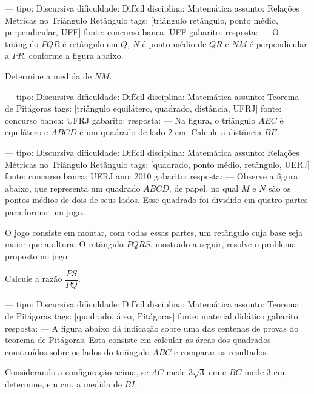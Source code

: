 
---
tipo: Discursiva
dificuldade: Difícil
disciplina: Matemática
assunto: Relações Métricas no Triângulo Retângulo
tags: [triângulo retângulo, ponto médio, perpendicular, UFF]
fonte: concurso
banca: UFF
gabarito:
resposta:
---
\question
O triângulo $PQR$ é retângulo em $Q$, $N$ é ponto médio de $QR$ e $NM$ é perpendicular a $PR$, conforme a figura abaixo.


Determine a medida de $NM$.

---
tipo: Discursiva
dificuldade: Difícil
disciplina: Matemática
assunto: Teorema de Pitágoras
tags: [triângulo equilátero, quadrado, distância, UFRJ]
fonte: concurso
banca: UFRJ
gabarito:
resposta:
---
\question
Na figura, o triângulo $AEC$ é equilátero e $ABCD$ é um quadrado de lado 2 cm. Calcule a distância $BE$.


---
tipo: Discursiva
dificuldade: Difícil
disciplina: Matemática
assunto: Relações Métricas no Triângulo Retângulo
tags: [quadrado, ponto médio, retângulo, UERJ]
fonte: concurso
banca: UERJ
ano: 2010
gabarito:
resposta:
---
\question
Observe a figura abaixo, que representa um quadrado $ABCD$, de papel, no qual $M$ e $N$ são os pontos médios de dois de seus lados. Esse quadrado foi dividido em quatro partes para formar um jogo.


O jogo consiste em montar, com todas essas partes, um retângulo cuja base seja maior que a altura. O retângulo $PQRS$, mostrado a seguir, resolve o problema proposto no jogo.


Calcule a razão $\dfrac{PS}{PQ}$.

---
tipo: Discursiva
dificuldade: Difícil
disciplina: Matemática
assunto: Teorema de Pitágoras
tags: [quadrado, área, Pitágoras]
fonte: material didático
gabarito:
resposta:
---
\question
A figura abaixo dá indicação sobre uma das centenas de provas do teorema de Pitágoras. Esta consiste em calcular as áreas dos quadrados construídos sobre os lados do triângulo $ABC$ e comparar os resultados.


Considerando a configuração acima, se $AC$ mede $3\sqrt{3}$ cm e $BC$ mede 3 cm, determine, em cm, a medida de $BI$.

